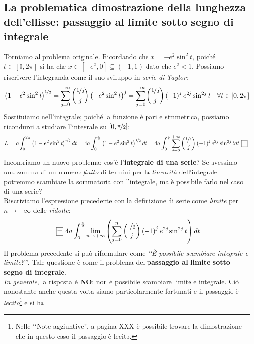 \subsection{La problematica dimostrazione della lunghezza dell'ellisse: passaggio al limite sotto segno di integrale}
Torniamo al problema originale. Ricordando che $x=-e^2\sin^2 t$, poiché $t\in\left[0,2\pi\right]$ si ha che $x\in\left[-e^2, 0\right]\subseteq\left(-1, 1\right)$ dato che $e^2<1$. Possiamo riscrivere l'integranda come il suo sviluppo in \textit{serie di Taylor}:
\begin{align*}
	\left(1-e^2\sin^2t\right)^{\nicefrac{1}{2}}=\sum_{j=0}^{+\infty}\binom{\nicefrac{1}{2}}{j}\left(-e^2\sin^2t\right)^j=\sum_{j=0}^{+\infty}\binom{\nicefrac{1}{2}}{j}\left(-1\right)^je^{2j}\sin^{2j}t\quad \forall t\in\left[0, 2\pi\right]
\end{align*}
Sostituiamo nell'integrale; poiché la funzione è pari e simmetrica, possiamo ricondurci a studiare l'integrale su $\left[0,\nicefrac{\pi}{2}\right]$:
\begin{equation*}
L=a\int_{0}^{2\pi}\left(1-e^2\sin^2t\right)^{\nicefrac{1}{2}}dt=4a\int_{0}^{\frac{\pi}{2}}\left(1-e^2\sin^2t\right)^{\nicefrac{1}{2}}dt=4a\int_{0}^{\frac{\pi}{2}}\sum_{j=0}^{+\infty}\binom{\nicefrac{1}{2}}{j}\left(-1\right)^je^{2j}\sin^{2j}tdt\squarequal
\end{equation*}
Incontriamo un nuovo problema: cos'è l'\textbf{integrale di una serie}? Se avessimo una somma di un numero \textit{finito} di termini per la \textit{linearità} dell'integrale potremmo scambiare la sommatoria con l'integrale, ma è possibile farlo nel caso di una serie?\\
Riscriviamo l'espressione precedente con la definizione di serie come \textit{limite} per $n\to +\infty$ delle \textit{ridotte}:
\begin{equation*}
	\squarequal 4a\int_{0}^{\frac{\pi}{2}}\lim_{n\to +\infty}\left(\sum_{j=0}^{n}\binom{\nicefrac{1}{2}}{j}\left(-1\right)^je^{2j}\sin^{2j}t\right)dt
\end{equation*}
Il problema precedente si può riformulare come \emph{‘‘È possibile scambiare integrale e limite?''}. Tale questione è come il problema del \textbf{passaggio al limite sotto segno di integrale}.\\
\textit{In generale}, la risposta è \textbf{NO}: non è possibile scambiare limite e integrale. Ciò nonostante anche questa volta siamo particolarmente fortunati e il passaggio è \textit{lecito}\footnote{Nelle ‘‘Note aggiuntive'', a pagina XXX è possibile trovare la dimostrazione che in questo caso il passaggio è lecito.} e si ha
